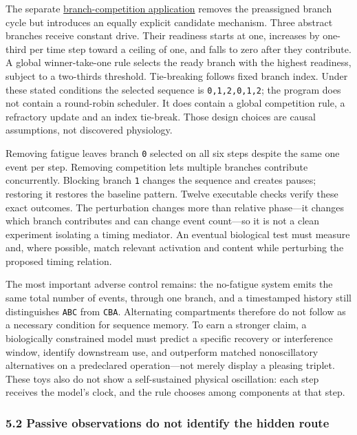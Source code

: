 \documentclass[
  american,
  11pt,
  letterpaper,
]{article}
\begin{document}
The separate \href{https://github.com/v5ma/v5ma.github.io/blob/f6d3867df89ae9dea32f763b1d55c84212c41cc6/papers/companions/five-papers-20260923/temporal/paper/applications/branch-competition-v02/README.md}{branch-competition application} removes the preassigned branch cycle but introduces an equally explicit candidate mechanism. Three abstract branches receive constant drive. Their readiness starts at one, increases by one-third per time step toward a ceiling of one, and falls to zero after they contribute. A global winner-take-one rule selects the ready branch with the highest readiness, subject to a two-thirds threshold. Tie-breaking follows fixed branch index. Under these stated conditions the selected sequence is \texttt{0,1,2,0,1,2}; the program does not contain a round-robin scheduler. It does contain a global competition rule, a refractory update and an index tie-break. Those design choices are causal assumptions, not discovered physiology.

Removing fatigue leaves branch \texttt{0} selected on all six steps despite the same one event per step. Removing competition lets multiple branches contribute concurrently. Blocking branch \texttt{1} changes the sequence and creates pauses; restoring it restores the baseline pattern. Twelve executable checks verify these exact outcomes. The perturbation changes more than relative phase---it changes which branch contributes and can change event count---so it is not a clean experiment isolating a timing mediator. An eventual biological test must measure and, where possible, match relevant activation and content while perturbing the proposed timing relation.

The most important adverse control remains: the no-fatigue system emits the same total number of events, through one branch, and a timestamped history still distinguishes \texttt{ABC} from \texttt{CBA}. Alternating compartments therefore do not follow as a necessary condition for sequence memory. To earn a stronger claim, a biologically constrained model must predict a specific recovery or interference window, identify downstream use, and outperform matched nonoscillatory alternatives on a predeclared operation---not merely display a pleasing triplet. These toys also do not show a self-sustained physical oscillation: each step receives the model's clock, and the rule chooses among components at that step.

\subsubsection{5.2 Passive observations do not identify the hidden route}\label{passive-observations-do-not-identify-the-hidden-route}
\end{document}
